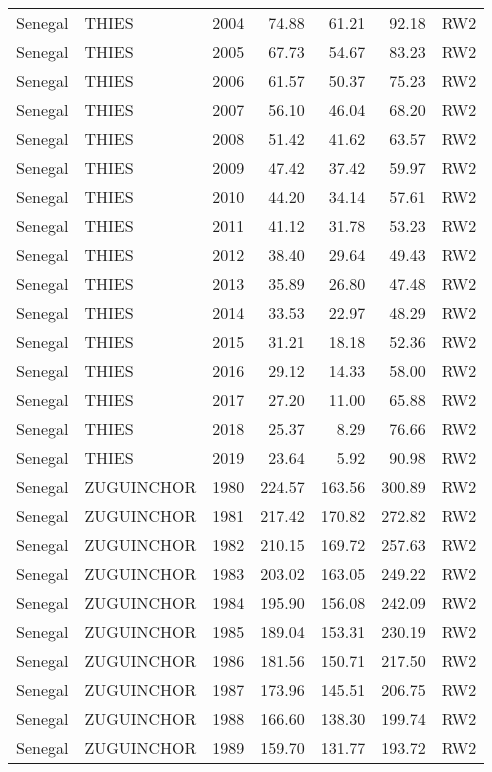 \begin{longtable}{lllrrrl}
  Senegal & THIES & 2004 & 74.88 & 61.21 & 92.18 & RW2 \\ 
  Senegal & THIES & 2005 & 67.73 & 54.67 & 83.23 & RW2 \\ 
  Senegal & THIES & 2006 & 61.57 & 50.37 & 75.23 & RW2 \\ 
  Senegal & THIES & 2007 & 56.10 & 46.04 & 68.20 & RW2 \\ 
  Senegal & THIES & 2008 & 51.42 & 41.62 & 63.57 & RW2 \\ 
  Senegal & THIES & 2009 & 47.42 & 37.42 & 59.97 & RW2 \\ 
  Senegal & THIES & 2010 & 44.20 & 34.14 & 57.61 & RW2 \\ 
  Senegal & THIES & 2011 & 41.12 & 31.78 & 53.23 & RW2 \\ 
  Senegal & THIES & 2012 & 38.40 & 29.64 & 49.43 & RW2 \\ 
  Senegal & THIES & 2013 & 35.89 & 26.80 & 47.48 & RW2 \\ 
  Senegal & THIES & 2014 & 33.53 & 22.97 & 48.29 & RW2 \\ 
  Senegal & THIES & 2015 & 31.21 & 18.18 & 52.36 & RW2 \\ 
  Senegal & THIES & 2016 & 29.12 & 14.33 & 58.00 & RW2 \\ 
  Senegal & THIES & 2017 & 27.20 & 11.00 & 65.88 & RW2 \\ 
  Senegal & THIES & 2018 & 25.37 & 8.29 & 76.66 & RW2 \\ 
  Senegal & THIES & 2019 & 23.64 & 5.92 & 90.98 & RW2 \\ 
  Senegal & ZUGUINCHOR & 1980 & 224.57 & 163.56 & 300.89 & RW2 \\ 
  Senegal & ZUGUINCHOR & 1981 & 217.42 & 170.82 & 272.82 & RW2 \\ 
  Senegal & ZUGUINCHOR & 1982 & 210.15 & 169.72 & 257.63 & RW2 \\ 
  Senegal & ZUGUINCHOR & 1983 & 203.02 & 163.05 & 249.22 & RW2 \\ 
  Senegal & ZUGUINCHOR & 1984 & 195.90 & 156.08 & 242.09 & RW2 \\ 
  Senegal & ZUGUINCHOR & 1985 & 189.04 & 153.31 & 230.19 & RW2 \\ 
  Senegal & ZUGUINCHOR & 1986 & 181.56 & 150.71 & 217.50 & RW2 \\ 
  Senegal & ZUGUINCHOR & 1987 & 173.96 & 145.51 & 206.75 & RW2 \\ 
  Senegal & ZUGUINCHOR & 1988 & 166.60 & 138.30 & 199.74 & RW2 \\ 
  Senegal & ZUGUINCHOR & 1989 & 159.70 & 131.77 & 193.72 & RW2 \\ 

\end{longtable}

